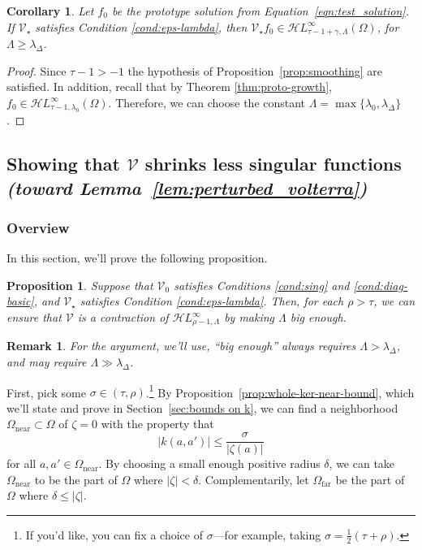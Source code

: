 \documentclass{article}
\theoremstyle{plain}
\newtheorem{prop}{Proposition}
\newtheorem{rmk}{Remark}
\newtheorem{cor}{Corollary}
\newcommand{\singexp}[2]{\mathcal{H}L^\infty_{#1, #2}}
\newcommand{\volterra}{\mathcal{V}}
\newcommand{\hardpart}{\mathcal{V}_0}
\newcommand{\softpart}{\mathcal{V}_\star}
\newcommand{\solproto}{f_0}
\newcommand{\domain}{\Omega}
\newcommand{\near}{\Omega_\text{near}}
\newcommand{\far}{\Omega_\text{far}}
\begin{document}
\begin{cor}\label{cor:pertub_f0}
Let $f_0$ be the prototype solution from Equation~\eqref{eqn:test_solution}. If $\softpart$ satisfies {\em Condition \eqref{cond:eps-lambda}}, then $\softpart f_0\in\singexp{\tau-1+\gamma}{\Lambda}(\Omega)$, for $\Lambda\geq \lambda_\Delta$. 
\end{cor}
\begin{proof}
Since $\tau-1>-1$ the hypothesis of Proposition~\ref{prop:smoothing} are satisfied. In addition, recall that by Theorem \ref{thm:proto-growth}, $\solproto\in\singexp{\tau-1}{\lambda_0}(\domain)$. Therefore, we can choose the constant $\Lambda=\max \{\lambda_0 , \lambda_\Delta\}$.
\end{proof}

\subsection{Showing that $\volterra$ shrinks less singular functions \\ \textit{(toward Lemma~\ref{lem:perturbed_volterra})}}\label{sec:V is a contraction}
\subsubsection{Overview}
In this section, we'll prove the following proposition. %

\begin{prop}\label{prop:get-contraction}
Suppose that $\hardpart$ satisfies {\em Conditions \eqref{cond:sing}} and \eqref{cond:diag-basic}, and $\softpart$ satisfies {\em Condition \eqref{cond:eps-lambda}}. Then, for each $\rho > \tau$, we can ensure that $\volterra$ is a contraction of $\singexp{\rho-1}{\Lambda}$ by making $\Lambda$ big enough.
\end{prop}
\begin{rmk}
For the argument, we'll use, ``big enough'' always requires $\Lambda > \lambda_\Delta$, and may require $\Lambda \gg \lambda_\Delta$.
\end{rmk}
First, pick some $\sigma \in (\tau, \rho)$.\footnote{If you'd like, you can fix a choice of $\sigma$---for example, taking $\sigma = \frac{1}{2}(\tau + \rho)$.} By Proposition~\ref{prop:whole-ker-near-bound}, which we'll state and prove in Section~\ref{sec:bounds on k}, we can find a neighborhood $\near \subset \domain$ of $\zeta = 0$ with the property that
\begin{equation}\label{near-limit}
|k(a, a')| \le \frac{\sigma}{|\zeta(a)|}
\end{equation}
for all $a, a' \in \near$. By choosing a small enough positive radius $\delta$, we can take $\near$ to be the part of $\domain$ where $|\zeta| < \delta$. Complementarily, let $\far$ be the part of $\domain$ where $\delta \le |\zeta|$.
\end{document}
